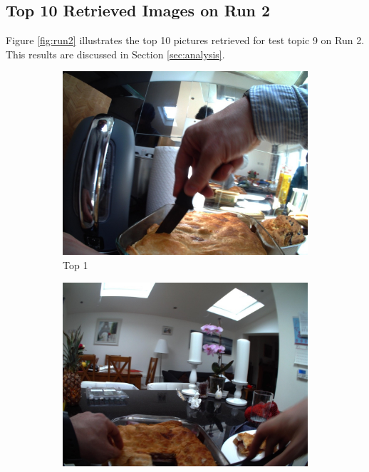 \newpage
\subsection{Top 10 Retrieved Images on Run 2}
Figure \ref{fig:run2} illustrates the top 10 pictures retrieved for test topic 9 on Run 2. This results are discussed in Section \ref{sec:analysis}.\\


\begin{figure}[H]
    \centering
    \captionsetup{justification=centering}
  
        \begin{subfigure}{0.32\textwidth}
          \includegraphics[width=\textwidth]{Sections/7Results/images/run2top1.jpg} 
          \caption{Top 1}
        \end{subfigure}
        \begin{subfigure}{0.32\textwidth}
          \includegraphics[width=\textwidth]{Sections/7Results/images/run3top2.jpg}\hfill

\end{subfigure}
\end{figure}
